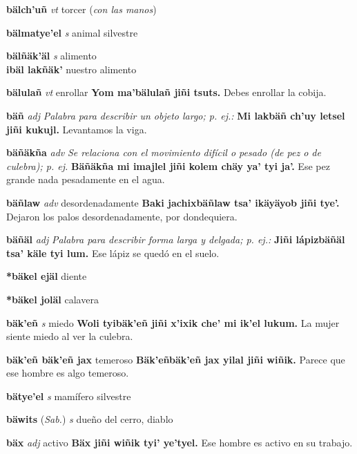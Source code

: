 \documentclass[10pt]{scrbook}
\newcommand{\entry}[1]{\textbf{#1}}
\newcommand{\nontranslationdef}[1]{\textit{#1}}
\newcommand{\partofspeech}[1]{\textit{#1}}
\newcommand{\spanishtranslation}[1]{#1}
\newcommand{\clarification}[1]{(\textit{#1})}
\newcommand{\cholexample}[1]{\textbf{#1}}
\newcommand{\exampletranslation}[1]{#1}
\newcommand{\relevantdialect}[1]{(\textit{#1})}
\newcommand{\secondaryentry}[1]{\\\textbf{#1}}
\newcommand{\secondtranslation}[1]{#1}
\begin{document}
\begin{multicols}{2}
\entry{bälch'uñ}
\partofspeech{vt}
\spanishtranslation{torcer}
\clarification{con las manos}

\entry{bälmatye'el}
\partofspeech{s}
\spanishtranslation{animal silvestre}

\entry{bälñäk'äl}
\partofspeech{s}
\spanishtranslation{alimento}
\secondaryentry{ibäl lakñäk'}
\secondtranslation{nuestro alimento}

\entry{bälulañ}
\partofspeech{vt}
\spanishtranslation{enrollar}
\cholexample{Yom ma'bälulañ jiñi tsuts.}
\exampletranslation{Debes enrollar la cobija.}

\entry{bäñ}
\partofspeech{adj}
\nontranslationdef{Palabra para describir un objeto largo; p. ej.:}
\cholexample{Mi lakbäñ ch'uy letsel jiñi kukujl.}
\exampletranslation{Levantamos la viga.}

\entry{bäñäkña}
\partofspeech{adv}
\nontranslationdef{Se relaciona con el movimiento difícil o pesado (de pez o de culebra); p. ej.}
\cholexample{Bäñäkña mi imajlel jiñi kolem chäy ya' tyi ja'.}
\exampletranslation{Ese pez grande nada pesadamente en el agua.}

\entry{bäñlaw}
\partofspeech{adv}
\spanishtranslation{desordenadamente}
\cholexample{Baki jachixbäñlaw tsa' ikäyäyob jiñi tye'.}
\exampletranslation{Dejaron los palos desordenadamente, por dondequiera.}

\entry{bäñäl}
\partofspeech{adj}
\nontranslationdef{Palabra para describir forma larga y delgada; p. ej.:}
\cholexample{Jiñi lápizbäñäl tsa' käle tyi lum.}
\exampletranslation{Ese lápiz se quedó en el suelo.}

\entry{*bäkel ejäl}
\spanishtranslation{diente}

\entry{*bäkel joläl}
\spanishtranslation{calavera}

\entry{bäk'eñ}
\partofspeech{s}
\spanishtranslation{miedo}
\cholexample{Woli tyibäk'eñ jiñi x'ixik che' mi ik'el lukum.}
\exampletranslation{La mujer siente miedo al ver la culebra.}

\entry{bäk'eñ bäk'eñ jax}
\spanishtranslation{temeroso}
\cholexample{Bäk'eñbäk'eñ jax yilal jiñi wiñik.}
\exampletranslation{Parece que ese hombre es algo temeroso.}

\entry{bätye'el}
\partofspeech{s}
\spanishtranslation{mamífero silvestre}

\entry{bäwits}
\relevantdialect{Sab.}
\partofspeech{s}
\spanishtranslation{dueño del cerro, diablo}

\entry{bäx}
\partofspeech{adj}
\spanishtranslation{activo}
\cholexample{Bäx jiñi wiñik tyi' ye'tyel.}
\exampletranslation{Ese hombre es activo en su trabajo.}


\end{multicols}
\end{document}
